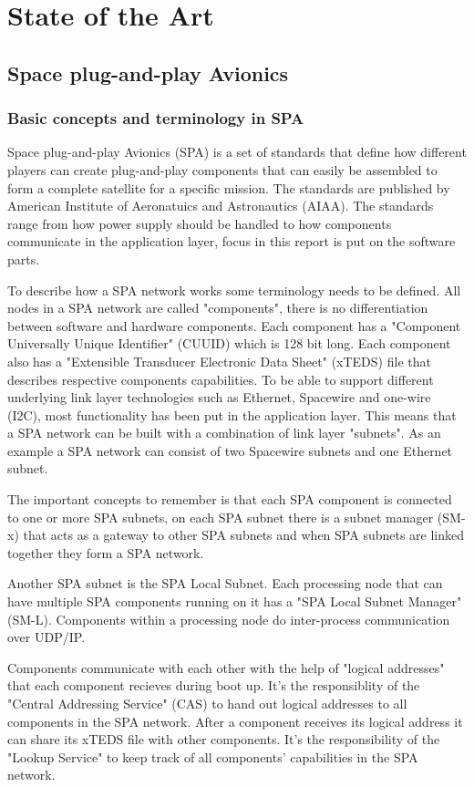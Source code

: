 \chapter{State of the Art} \label{ch:state_of_the_art}

\section{Space plug-and-play Avionics}
\subsection{Basic concepts and terminology in SPA}
Space plug-and-play Avionics (SPA) is a set of standards that define how
different players can create plug-and-play components that can easily be
assembled to form a complete satellite for a specific mission. The standards
are published by American Institute of Aeronatuics and Astronautics (AIAA). The
standards range from how power supply should be handled to how components
communicate in the application layer, focus in this report is put on the
software parts.

To describe how a SPA network works some terminology needs to be defined. All
nodes in a SPA network are called "components", there is no differentiation
between software and hardware components. Each component has a "Component
Universally Unique Identifier" (CUUID) which is 128 bit long. Each component
also has a "Extensible Transducer Electronic Data Sheet" (xTEDS) file that
describes respective components capabilities. To be able to support different
underlying link layer technologies such as Ethernet, Spacewire and one-wire
(I2C), most functionality has been put in the application layer. This means
that a SPA network can be built with a combination of link layer "subnets". As
an example a SPA network can consist of two Spacewire subnets and one Ethernet
subnet.

The important concepts to remember is that each SPA component is
connected to one or more SPA subnets, on each SPA subnet there is a subnet
manager (SM-x) that acts as a gateway to other SPA subnets and when SPA subnets
are linked together they form a SPA network.

Another SPA subnet is the SPA Local Subnet. Each processing node that can
have multiple SPA components running on it has a "SPA Local Subnet Manager"
(SM-L).  Components within a processing node do inter-process communication
over UDP/IP.

Components communicate with each other with the help of "logical addresses"
that each component recieves during boot up. It's the responsiblity of the
"Central Addressing Service" (CAS) to hand out logical addresses to all
components in the SPA network. After a component receives its logical address
it can share its xTEDS file with other components. It's the responsibility of
the "Lookup Service" to keep track of all components' capabilities in the SPA
network.

